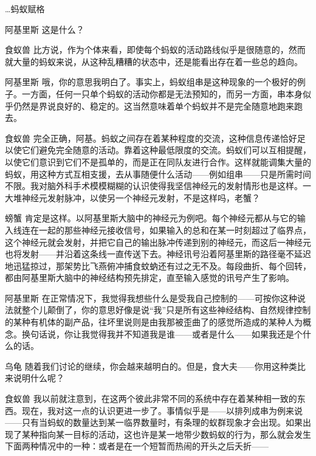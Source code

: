 \begin{dialog}{…蚂蚁赋格}
\begin{dialogue}
\item[阿基里斯]这是什么？

\item[食蚁兽]比方说，作为个体来看，即使每个蚂蚁的活动路线似乎是很随意的，然而就大量的蚂蚁来说，从这种乱糟糟的状态中，还是能看出存在着一些总的趋向。

\item[阿基里斯]哦，你的意思我明白了。事实上，蚂蚁组串是这种现象的一个极好的例子。一方面，任何一只单个蚂蚁的活动你都是无法预知的，而另一方面，串本身似乎仍然是界说良好的、稳定的。这当然意味着单个蚂蚁并不是完全随意地跑来跑去。

\item[食蚁兽]完全正确，阿基。蚂蚁之间存在着某种程度的交流，这种信息传递恰好足以使它们避免完全随意的活动。靠着这种最低限度的交流。蚂蚁们可以互相提醒，以使它们意识到它们不是孤单的，而是正在同队友进行合作。这样就能调集大量的蚂蚁，用这种方式互相支援，去从事随便什么活动——例如组串——只是所需时间不限。我对脑外科手术模模糊糊的认识使得我坚信神经元的发射情形也是这样。一大堆神经元发射脉冲，以使另一个神经元发射，不是这样吗，老蟹？

\item[螃蟹]肯定是这样。以阿基里斯大脑中的神经元为例吧。每个神经元都从与它的输入线连在一起的那些神经元接收信号，如果输入的总和在某一时刻超过了临界点，这个神经元就会发射，并把它自己的输出脉冲传递到别的神经元，而这后一神经元也将发射——并沿着这条线一直传送下去。神经讯号沿着阿基里斯的路径毫不延迟地迅猛掠过，那架势比飞燕俯冲捕食蚊蚋还有过之无不及。每段曲折、每个回转，都由阿基里斯大脑中的神经结构预先排定，直至输入感觉的讯号产生了影响。

\item[阿基里斯]在正常情况下，我觉得我想些什么是受我自己控制的——可按你这种说法就整个儿颠倒了，你的意思好像是说“我”只是所有这些神经结构、自然规律控制的某种有机体的副产品，往坏里说则是由我那被歪曲了的感觉所造成的某种人为概念。换句话说，你让我觉得我并不知道我是谁——或者是什么——如果我还是个什么的话。

\item[乌龟]随着我们讨论的继续，你会越来越明白的。但是，食大夫——你用这种类比来说明什么呢？

\item[食蚁兽]我以前就注意到，在这两个彼此非常不同的系统中存在着某种相一致的东西。现在，我对这一点的认识更进一步了。事情似乎是——以排列成串为例来说——只有当蚂蚁的数量达到某一临界数量时，有条理的蚁群现象才会出现。如果出现了某种指向某一目标的活动，这也许是某一地带少数蚂蚁的行为，那么就会发生下面两种情况中的一种：或者是在一个短暂而热闹的开头之后夭折——


\end{dialogue}
\end{dialog}
